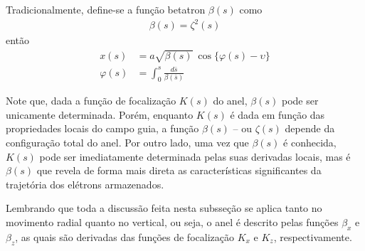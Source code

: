 Tradicionalmente, define-se a função betatron $\beta(s)$ como
\begin{align}
	\beta(s) = \zeta^2(s)
\end{align}
então
\begin{align}
	x(s) &= a\sqrt{\beta(s)}\ \cos\{\varphi(s)-\upsilon\}\label{eq:2.43}\\
	\varphi(s) &= \int_{0}^{s} \frac{d\bar{s}}{\beta(\bar{s})}\label{eq:2.44}
\end{align}
	
Note que, dada a função de focalização $K(s)$ do anel, $\beta(s)$ pode ser unicamente determinada. Porém, enquanto $K(s)$ é dada em função das propriedades locais do campo guia, a função $\beta(s)$ -- ou $\zeta(s)$ depende da configuração total do anel. Por outro lado, uma vez que $\beta(s)$ é conhecida, $K(s)$ pode ser imediatamente determinada pelas suas derivadas locais, mas é $\beta(s)$ que revela de forma mais direta as características significantes da trajetória dos elétrons armazenados.
	
Lembrando que toda a discussão feita nesta subsseção se aplica tanto no movimento radial quanto no vertical, ou seja, o anel é descrito pelas funções $\beta_x$ e $\beta_z$, as quais são derivadas das funções de focalização $K_x$ e $K_z$, respectivamente.